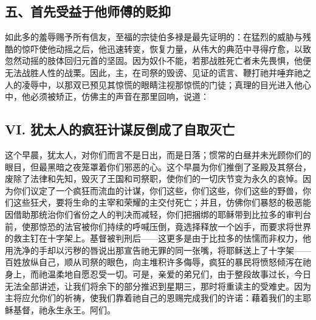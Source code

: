\subsection{五、首先受益于他师傅的贬抑}

如此多的羞辱赐予所有信友，至福的宗徒伯多禄是最先证明的：在猛烈的威胁与残酷的惊吓使他动摇之后，他迅速转变，恢复力量，从伟大的典范中寻得疗愈，以致忽然动摇的肢体回归元首的坚固。因为奴仆不能，若那战胜死亡者未先畏惧，他便无法战胜人性的战栗。因此，主，在司祭的毁谤、见证的谎言、鞭打祂并唾弃祂之人的凌辱中，以那双已预见其惊慌的眼睛注视那惊慌的门徒；真理的目光进入他心中，他必须被矫正，仿佛主的声音在那里回响，说道：\par


\subsection{VI. 犹太人的疯狂计谋反倒成了自取灭亡}

这个早晨，犹太人，对你们而言不是日出，而是日落；惯常的白昼并未光顾你们的眼目，但最黑暗之夜笼罩着你们邪恶的心。这个早晨为你们推倒了圣殿及其祭台，废除了法律和先知，毁灭了王国和司祭职，使你们的一切庆节变为永久的哀悼。因为你们议定了一个疯狂而流血的计谋，你们这些，你们这些，你们这些的野兽，你们这些狂犬，要将生命的主宰和荣耀的主交付死亡；并且，仿佛你们暴怒的极恶能因借助那统治你们省份之人的判决而减轻，你们把捆绑的耶稣带到比拉多的审判台前，使那惊恐的法官被你们持续的呼喊压倒，竟选择释放一个凶手，而要求将世界的救主钉在十字架上。基督被判刑后——这更多是由于比拉多的怯懦而非权力，他用洗净的手却以污秽的唇说出那宣告祂无罪的同一张嘴，将耶稣送上了十字架——百姓放纵自己，顺从司祭的眼色，向主堆积许多侮辱，疯狂的暴民将愤怒倾泻在祂身上，而祂温柔地自愿忍受一切。可是，亲爱的弟兄们，由于整段故事过长，今日无法全部讲述，让我们将余下的部分推迟到星期三，那时将重读主的受难史。因为主将应允你们的祈祷，使我们靠着祂自己的恩赐完成我们的许诺：藉着我们的主耶稣基督，祂永生永王。阿们。\par


